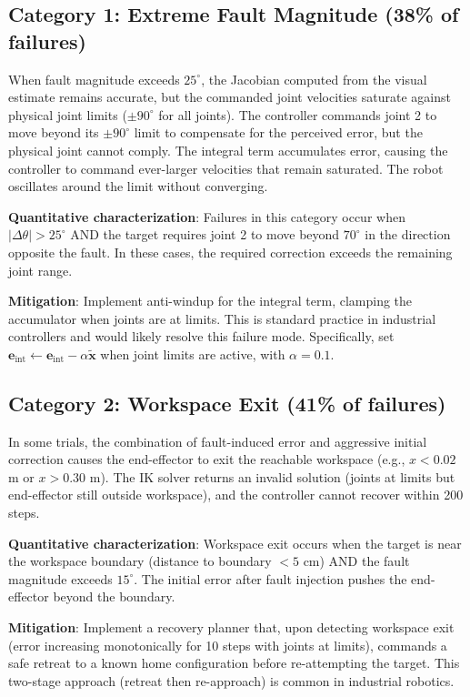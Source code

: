 ﻿\documentclass[12pt,a4paper,oneside]{report}
\begin{document}
\subsection{Category 1: Extreme Fault Magnitude (38\% of failures)}

When fault magnitude exceeds $25^\circ$, the Jacobian computed from the visual estimate remains accurate, but the commanded joint velocities saturate against physical joint limits ($\pm90^\circ$ for all joints). The controller commands joint 2 to move beyond its $\pm90^\circ$ limit to compensate for the perceived error, but the physical joint cannot comply. The integral term accumulates error, causing the controller to command ever-larger velocities that remain saturated. The robot oscillates around the limit without converging.

\textbf{Quantitative characterization}: Failures in this category occur when $|\Delta \theta| > 25^\circ$ AND the target requires joint 2 to move beyond $70^\circ$ in the direction opposite the fault. In these cases, the required correction exceeds the remaining joint range.

\textbf{Mitigation}: Implement anti-windup for the integral term, clamping the accumulator when joints are at limits. This is standard practice in industrial controllers and would likely resolve this failure mode. Specifically, set $\mathbf{e}_{\text{int}} \leftarrow \mathbf{e}_{\text{int}} - \alpha \tilde{\mathbf{x}}$ when joint limits are active, with $\alpha = 0.1$.

\subsection{Category 2: Workspace Exit (41\% of failures)}

In some trials, the combination of fault-induced error and aggressive initial correction causes the end-effector to exit the reachable workspace (e.g., $x < 0.02$ m or $x > 0.30$ m). The IK solver returns an invalid solution (joints at limits but end-effector still outside workspace), and the controller cannot recover within 200 steps.

\textbf{Quantitative characterization}: Workspace exit occurs when the target is near the workspace boundary (distance to boundary $< 5$ cm) AND the fault magnitude exceeds $15^\circ$. The initial error after fault injection pushes the end-effector beyond the boundary.

\textbf{Mitigation}: Implement a recovery planner that, upon detecting workspace exit (error increasing monotonically for 10 steps with joints at limits), commands a safe retreat to a known home configuration before re-attempting the target. This two-stage approach (retreat then re-approach) is common in industrial robotics.
\end{document}
